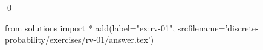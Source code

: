
\begin{ex} 
  \label{ex:rv-01}
  
  \qed
\end{ex} 
\begin{python0}
from solutions import *
add(label="ex:rv-01",
    srcfilename='discrete-probability/exercises/rv-01/answer.tex') 
\end{python0}
